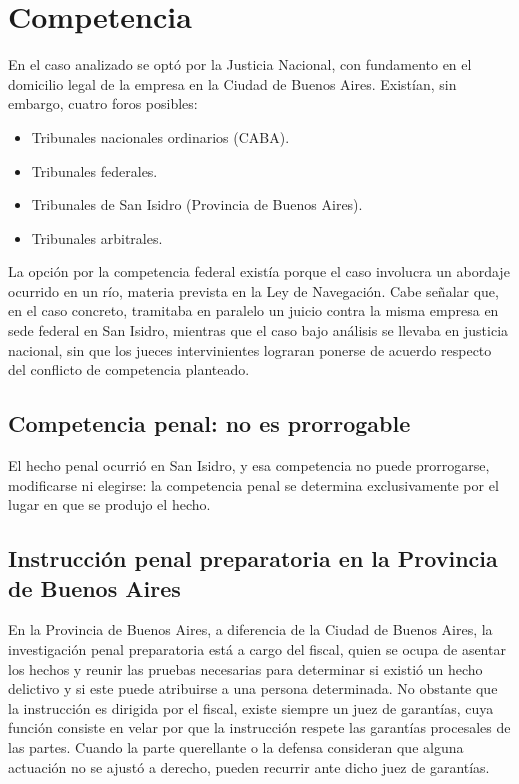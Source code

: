\documentclass[12pt,oneside]{book}
\begin{document}
\section{Competencia}

En el caso analizado se optó por la Justicia Nacional, con fundamento en el domicilio legal de la empresa en la Ciudad de Buenos Aires. Existían, sin embargo, cuatro foros posibles:

\begin{itemize}
    \item Tribunales nacionales ordinarios (CABA).
    \item Tribunales federales.
    \item Tribunales de San Isidro (Provincia de Buenos Aires).
    \item Tribunales arbitrales.
\end{itemize}

La opción por la competencia federal existía porque el caso involucra un abordaje ocurrido en un río, materia prevista en la Ley de Navegación. Cabe señalar que, en el caso concreto, tramitaba en paralelo un juicio contra la misma empresa en sede federal en San Isidro, mientras que el caso bajo análisis se llevaba en justicia nacional, sin que los jueces intervinientes lograran ponerse de acuerdo respecto del conflicto de competencia planteado.

\subsection{Competencia penal: no es prorrogable}

\begin{important}
El hecho penal ocurrió en San Isidro, y esa competencia no puede prorrogarse, modificarse ni elegirse: la competencia penal se determina exclusivamente por el lugar en que se produjo el hecho.
\end{important}

\subsection{Instrucción penal preparatoria en la Provincia de Buenos Aires}

En la Provincia de Buenos Aires, a diferencia de la Ciudad de Buenos Aires, la investigación penal preparatoria está a cargo del fiscal, quien se ocupa de asentar los hechos y reunir las pruebas necesarias para determinar si existió un hecho delictivo y si este puede atribuirse a una persona determinada. No obstante que la instrucción es dirigida por el fiscal, existe siempre un juez de garantías, cuya función consiste en velar por que la instrucción respete las garantías procesales de las partes. Cuando la parte querellante o la defensa consideran que alguna actuación no se ajustó a derecho, pueden recurrir ante dicho juez de garantías.
\end{document}
